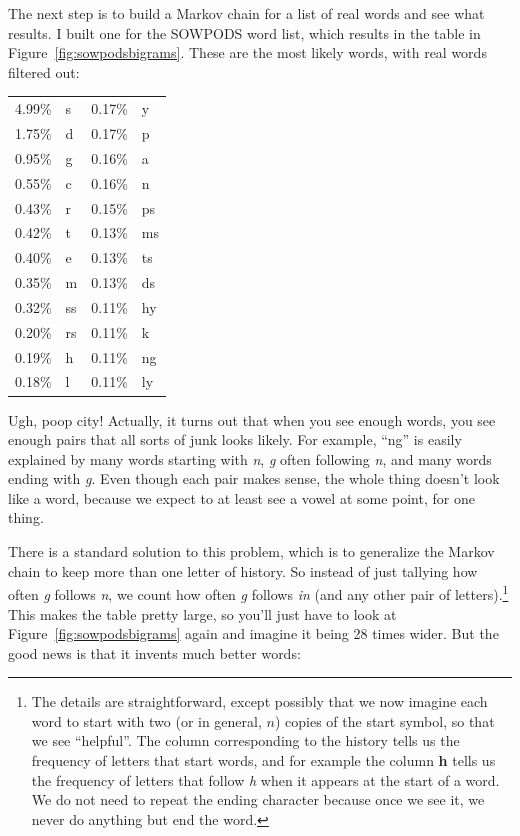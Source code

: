 \documentclass[twocolumn]{article}
\begin{document}
The next step is to build a Markov chain for a list of real words and
see what results. I built one for the SOWPODS word list, which results
in the table in Figure~\ref{fig:sowpodsbigrams}. These
are the most likely words, with real words filtered out:

\begin{center}
\begin{tabular}{rl@{\quad\quad}rl}
4.99\%  & s     &   0.17\%  & y   \\
1.75\%  & d     &   0.17\%  & p   \\
0.95\%  & g     &   0.16\%  & a   \\
0.55\%  & c     &   0.16\%  & n   \\
0.43\%  & r     &   0.15\%  & ps  \\
0.42\%  & t     &   0.13\%  & ms  \\
0.40\%  & e     &   0.13\%  & ts  \\
0.35\%  & m     &   0.13\%  & ds  \\
0.32\%  & ss    &   0.11\%  & hy  \\
0.20\%  & rs    &   0.11\%  & k   \\
0.19\%  & h     &   0.11\%  & ng  \\
0.18\%  & l     &   0.11\%  & ly  \\
\end{tabular}
\end{center}


Ugh, poop city! Actually, it turns out that when you see enough words,
you see enough pairs that all sorts of junk looks likely. For example,
``ng'' is easily explained by many words starting with {\it n}, {\it
g} often following {\it n}, and many words ending with {\it g}. Even
though each pair makes sense, the whole thing doesn't look like a word,
because we expect to at least see a vowel at some point, for one thing.

There is a standard solution to this problem, which is to generalize
the Markov chain to keep more than one letter of history. So instead
of just tallying how often {\it g} follows {\it n}, we count how often
{\it g} follows {\it in} (and any other pair of letters).\!\footnote{
  The details are straightforward, except possibly that we now imagine
  each word to start with two (or in general, $n$) copies of the start
  symbol, so that we see ``\<\<helpful\>''. The column corresponding
  to the history {\bf \<\<} tells us the frequency of letters that
  start words, and for example the column {\bf \<h} tells us the
  frequency of letters that follow {\it h} when it appears at the
  start of a word. We do not need to repeat the ending character \>
  because once we see it, we never do anything but end the word.} This
makes the table pretty large, so you'll just have to look at
Figure~\ref{fig:sowpodsbigrams} again and imagine it being 28 times
wider. But the good news is that it invents much better words:
\end{document}
